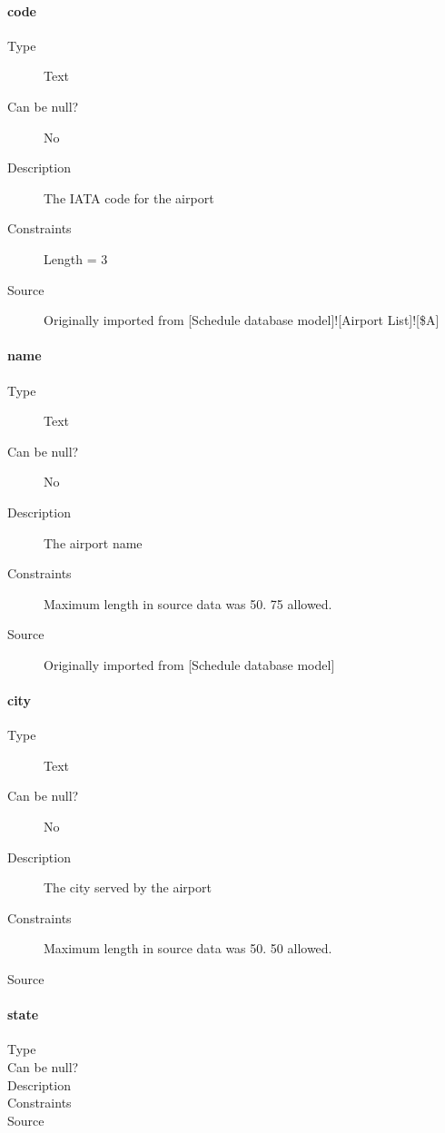 \documentclass[]{report}
\begin{document}
\paragraph{code}
	\begin{description}
	\item[Type]Text
	\item[Can be null?]No
	\item[Description]The IATA code for the airport
	\item[Constraints]Length = 3
	\item[Source]Originally imported from [Schedule database model]![Airport List]![\$A]
	\end{description}
\paragraph{name}
	\begin{description}
	\item[Type]Text
	\item[Can be null?]No
	\item[Description]The airport name
	\item[Constraints]Maximum length in source data was 50. 75 allowed.
	\item[Source]Originally imported from [Schedule database model]
	\end{description}
\paragraph{city}
	\begin{description}
	\item[Type]Text
	\item[Can be null?]No
	\item[Description]The city served by the airport
	\item[Constraints]Maximum length in source data was 50. 50 allowed.
	\item[Source]
	\end{description}
\paragraph{state}
	\begin{description}
	\item[Type]
	\item[Can be null?]
	\item[Description]
	\item[Constraints]
	\item[Source]
	\end{description}
\end{document}
